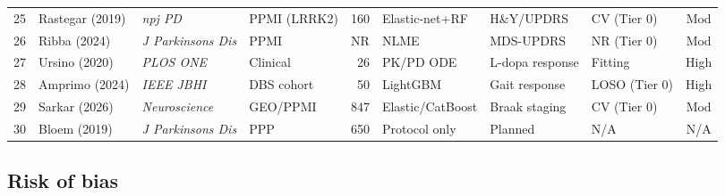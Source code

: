 \documentclass[11pt,a4paper]{article}
\begin{document}
\begin{landscape}
\begin{table}[p]
\begin{tabularx}{\linewidth}{@{}clllrlllc@{}}
25 & Rastegar (2019)   & \textit{npj PD}          & PPMI (LRRK2)      & 160   & Elastic-net+RF & H\&Y/UPDRS         & CV (Tier 0)  & Mod \\
26 & Ribba (2024)      & \textit{J Parkinsons Dis}& PPMI              & NR    & NLME           & MDS-UPDRS          & NR (Tier 0)  & Mod \\
27 & Ursino (2020)     & \textit{PLOS ONE}        & Clinical          & 26    & PK/PD ODE      & L-dopa response    & Fitting      & High \\
28 & Amprimo (2024)    & \textit{IEEE JBHI}       & DBS cohort        & 50    & LightGBM       & Gait response      & LOSO (Tier 0)& High \\
29 & Sarkar (2026)     & \textit{Neuroscience}    & GEO/PPMI          & 847   & Elastic/CatBoost & Braak staging    & CV (Tier 0)  & Mod \\
30 & Bloem (2019)      & \textit{J Parkinsons Dis}& PPP               & 650   & Protocol only  & Planned            & N/A          & N/A \\
\bottomrule
\end{tabularx}
\end{table}
\end{landscape}

\subsection{Risk of bias}
\end{document}
